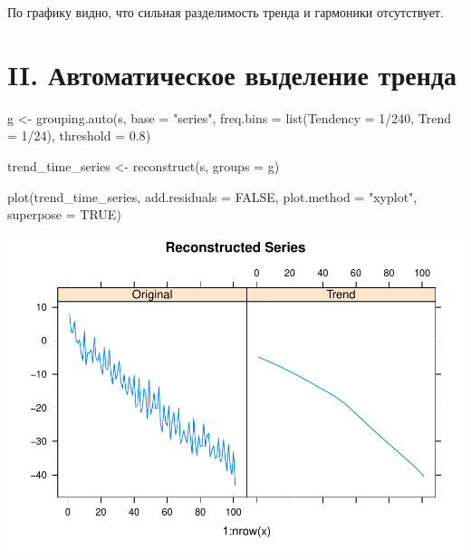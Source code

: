 \documentclass[specialist,
               substylefile = spbu_report.rtx,
               subf,href,colorlinks=true, 12pt]{disser}
\theoremstyle{definition}
\newenvironment{Shaded}{\begin{snugshade}}{\end{snugshade}}
\newcommand{\AttributeTok}[1]{\textcolor[rgb]{0.77,0.63,0.00}{#1}}
\newcommand{\ConstantTok}[1]{\textcolor[rgb]{0.00,0.00,0.00}{#1}}
\newcommand{\DecValTok}[1]{\textcolor[rgb]{0.00,0.00,0.81}{#1}}
\newcommand{\FloatTok}[1]{\textcolor[rgb]{0.00,0.00,0.81}{#1}}
\newcommand{\FunctionTok}[1]{\textcolor[rgb]{0.00,0.00,0.00}{#1}}
\newcommand{\NormalTok}[1]{#1}
\newcommand{\OtherTok}[1]{\textcolor[rgb]{0.56,0.35,0.01}{#1}}
\newcommand{\SpecialCharTok}[1]{\textcolor[rgb]{0.00,0.00,0.00}{#1}}
\newcommand{\StringTok}[1]{\textcolor[rgb]{0.31,0.60,0.02}{#1}}
\begin{document}
По графику видно, что сильная разделимость тренда и гармоники
отсутствует.

\hypertarget{ii.-ux430ux432ux442ux43eux43cux430ux442ux438ux447ux435ux441ux43aux43eux435-ux432ux44bux434ux435ux43bux435ux43dux438ux435-ux442ux440ux435ux43dux434ux430}{%
\section{II. Автоматическое выделение
тренда}\label{ii.-ux430ux432ux442ux43eux43cux430ux442ux438ux447ux435ux441ux43aux43eux435-ux432ux44bux434ux435ux43bux435ux43dux438ux435-ux442ux440ux435ux43dux434ux430}}

\begin{Shaded}
\begin{Highlighting}[]
\NormalTok{  g }\OtherTok{\textless{}{-}} \FunctionTok{grouping.auto}\NormalTok{(s, }\AttributeTok{base =} \StringTok{"series"}\NormalTok{, }
                 \AttributeTok{freq.bins =} \FunctionTok{list}\NormalTok{(}\AttributeTok{Tendency =} \DecValTok{1}\SpecialCharTok{/}\DecValTok{240}\NormalTok{, }\AttributeTok{Trend =} \DecValTok{1}\SpecialCharTok{/}\DecValTok{24}\NormalTok{), }
                 \AttributeTok{threshold =} \FloatTok{0.8}\NormalTok{)}
                 
\NormalTok{  trend\_time\_series }\OtherTok{\textless{}{-}} \FunctionTok{reconstruct}\NormalTok{(s, }\AttributeTok{groups =}\NormalTok{ g)}
  
  \FunctionTok{plot}\NormalTok{(trend\_time\_series, }
   \AttributeTok{add.residuals =} \ConstantTok{FALSE}\NormalTok{, }
   \AttributeTok{plot.method =} \StringTok{"xyplot"}\NormalTok{, }\AttributeTok{superpose =} \ConstantTok{TRUE}\NormalTok{)}
\end{Highlighting}
\end{Shaded}

\includegraphics{iossa_example2/decomposition-1.pdf}
\end{document}
